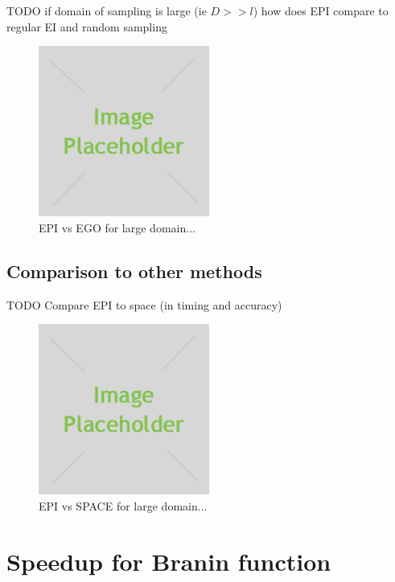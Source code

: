 \documentclass[phd,tocprelim]{cornell}
\begin{document}
TODO
if domain of sampling is large (ie $D >> l$) how does EPI compare to regular EI and random sampling
\begin{figure}[hpt]
 	\centerline{\includegraphics[width=0.5\textwidth]{figures/placeholder.jpg}}
    \caption[EPI comparison for large domain]{EPI vs EGO for large domain...}
 	\label{fig:EPI_res3}
\end{figure}

\subsection{Comparison to other methods}

TODO
Compare EPI to space (in timing and accuracy)
\begin{figure}[hpt]
 	\centerline{\includegraphics[width=0.5\textwidth]{figures/placeholder.jpg}}
    \caption[EPI vs SPACE for large domain]{EPI vs SPACE for large domain...}
 	\label{fig:EPI_res4}
\end{figure}

\section{Speedup for Branin function}
\end{document}

